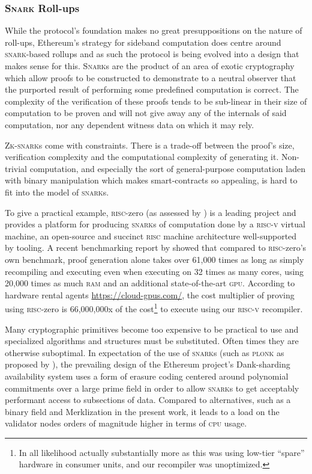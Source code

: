 \subsubsection{\textsc{Snark} Roll-ups}

While the protocol's foundation makes no great presuppositions on the nature of roll-ups, Ethereum's strategy for sideband computation does centre around \textsc{snark}-based rollups and as such the protocol is being evolved into a design that makes sense for this. \textsc{Snark}s are the product of an area of exotic cryptography which allow proofs to be constructed to demonstrate to a neutral observer that the purported result of performing some predefined computation is correct. The complexity of the verification of these proofs tends to be sub-linear in their size of computation to be proven and will not give away any of the internals of said computation, nor any dependent witness data on which it may rely.

\textsc{Zk-snark}s come with constraints. There is a trade-off between the proof's size, verification complexity and the computational complexity of generating it. Non-trivial computation, and especially the sort of general-purpose computation laden with binary manipulation which makes smart-contracts so appealing, is hard to fit into the model of \textsc{snark}s.

To give a practical example, \textsc{risc}-zero (as assessed by \cite{bogli2024assessing}) is a leading project and provides a platform for producing \textsc{snark}s of computation done by a \textsc{risc-v} virtual machine, an open-source and succinct \textsc{risc} machine architecture well-supported by tooling. A recent benchmarking report by \cite{koute2024risc0} showed that compared to \textsc{risc}-zero's own benchmark, proof generation alone takes over 61,000 times as long as simply recompiling and executing even when executing on 32 times as many cores, using 20,000 times as much \textsc{ram} and an additional state-of-the-art \textsc{gpu}. According to hardware rental agents \url{https://cloud-gpus.com/}, the cost multiplier of proving using \textsc{risc}-zero is 66,000,000x of the cost\footnote{In all likelihood actually substantially more as this was using low-tier ``spare'' hardware in consumer units, and our recompiler was unoptimized.} to execute using our \textsc{risc-v} recompiler.

Many cryptographic primitives become too expensive to be practical to use and specialized algorithms and structures must be substituted. Often times they are otherwise suboptimal. In expectation of the use of \textsc{snark}s (such as \textsc{plonk} as proposed by \cite{cryptoeprint:2019/953}), the prevailing design of the Ethereum project's Dank-sharding availability system uses a form of erasure coding centered around polynomial commitments over a large prime field in order to allow \textsc{snark}s to get acceptably performant access to subsections of data. Compared to alternatives, such as a binary field and Merklization in the present work, it leads to a load on the validator nodes orders of magnitude higher in terms of \textsc{cpu} usage.

